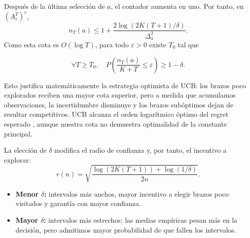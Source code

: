 Después de la última selección de \(a\), el contador aumenta en uno. Por tanto, en \((A_r^T)^c\),
\[
    n_T(a)\leq 1+\frac{2\log(2K(T+1)/\delta)}{\Delta_a^2}.
\]
Como esta cota es \(O(\log T)\), para todo \(\varepsilon>0\) existe \(T_0\) tal que

\begin{equation}
    \forall T\geq T_0,\quad P\left(\frac{n_T(a)}{K+T}\leq\varepsilon\right) \geq1-\delta.
\end{equation}

Esto justifica matemáticamente la estrategia optimista
de UCB: los brazos poco explorados reciben una mayor
cota superior, pero a medida que acumulamos
observaciones, la incertidumbre disminuye y los
brazos subóptimos dejan de resultar competitivos.
UCB alcanza el orden logarítmico óptimo del regret esperado \citep{lai1985asymptotically}, aunque nuestra cota no demuestra optimalidad de la constante principal.

La elección de \(\delta\) modifica el radio de confianza y, por tanto, el incentivo a explorar:
\[
    r(n)=\sqrt{\frac{\log(2K(T+1))+\log(1/\delta)}{2n}}.
\]
\begin{itemize}
    \item \textbf{Menor \(\delta\):} intervalos más anchos, mayor incentivo a elegir brazos poco visitados y garantía con mayor confianza.
    \item \textbf{Mayor \(\delta\):} intervalos más estrechos; las medias empíricas pesan más en la decisión, pero admitimos mayor probabilidad de que fallen los intervalos.
\end{itemize}
